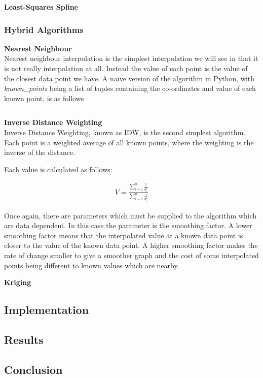 			\textbf{Least-Squares Spline}\label{datavalidation_least_squares_spline} \\

		\subsubsection{Hybrid Algorithms}\label{datavalidation_hybrid_algorithms}

			\textbf{Nearest Neighbour}\label{datavalidation_nearest_neighbour} \\

				Nearest neighbour interpolation is the simplest interpolation we will see in that it is not really interpolation at all. Instead the value of each point is the value of the closest data point we have. A na\"{\i}ve version of the algorithm in Python, with \emph{known\_points} being a list of tuples containing the co-ordinates and value of each known point, is as follows\:

				\inputminted[mathescape,linenos,numbersep=5pt,frame=lines,framesep=2mm]{python}{./code/nearest_neighbour.py}

			\textbf{Inverse Distance Weighting}\label{datavalidation_inversedistanceweighting} \\

				Inverse Distance Weighting, known as IDW, is the second simplest algorithm. Each point is a weighted average of all known points, where the weighting is the inverse of the distance. 

				Each value is calculated as follows:

				\begin{align*}
					V = \frac{\sum_{i=1}^{n}{\frac{v_{i}}{d^{p}_{i}}}}{\sum_{i=1}^{n}{\frac{1}{d^{p}_{i}}}}
				\end{align*}

				Once again, there are parameters which must be supplied to the algorithm which are data dependent. In this case the parameter is the smoothing factor. A lower smoothing factor means that the interpolated value at a known data point is closer to the value of the known data point. A higher smoothing factor makes the rate of change smaller to give a smoother graph and the cost of some interpolated points being different to known values which are nearby.

			\textbf{Kriging}\label{datavalidation_kriging} \\
		
	\subsection{Implementation}\label{datavalidation_implementation}
	\subsection{Results}\label{datavalidation_results}
	\subsection{Conclusion}\label{datavalidation_conclusion}
